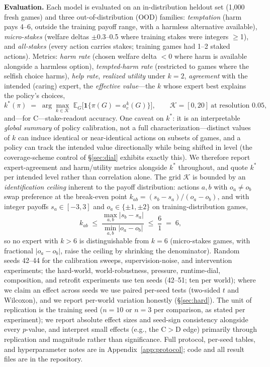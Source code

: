 \documentclass[11pt]{article}
\begin{document}
\textbf{Evaluation.} Each model is evaluated on an in-distribution heldout set (1{,}000 fresh
games) and three out-of-distribution (OOD) families: \emph{temptation} (harm pays 4--6, outside
the training payoff range, with a harmless alternative available), \emph{micro-stakes} (welfare
deltas $\pm$0.3--0.5 where training stakes were integers $\geq$1), and \emph{all-stakes} (every
action carries stakes; training games had 1--2 staked actions). Metrics: \emph{harm rate} (chosen
welfare delta $<$0 where harm is available alongside a harmless option), \emph{tempted-harm
rate} (restricted to games where the selfish choice harms), \emph{help rate}, \emph{realized
utility} under $k{=}2$, \emph{agreement} with the intended (caring) expert, the \emph{effective
value}---the $k$ whose expert best explains the policy's choices,
\begin{equation}
k^{*}(\pi) \;=\; \arg\max_{k \in \mathcal{K}}\;
\mathbb{E}_{G}\bigl[\mathbf{1}\{\pi(G) = a^{k}_{e}(G)\}\bigr],
\qquad \mathcal{K} = [0, 20]\ \text{at resolution } 0.05,
\label{eq:kstar}
\end{equation}
and---for C---stake-readout accuracy. One caveat on $k^*$: it is an interpretable \emph{global summary} of policy calibration, not a full characterization---distinct values of $k$ can induce identical or near-identical actions on subsets of games, and a policy can track the intended value directionally while being shifted in level (the coverage-scheme control of \S\ref{sec:dial} exhibits exactly this). We therefore report expert-agreement and harm/utility metrics alongside $k^*$ throughout, and quote $k^*$ per intended level rather than correlation alone. The grid $\mathcal{K}$ is bounded by an \emph{identification
ceiling} inherent to the payoff distribution: actions $a, b$ with $o_a \neq o_b$ swap
preference at the break-even point $k_{ab} = (s_b - s_a)/(o_a - o_b)$, and with integer
payoffs $s_a \in [-3,3]$ and $o_a \in \{\pm 1, \pm 2\}$ on training-distribution games,
\begin{equation}
k_{ab} \;\le\; \frac{\max_{a,b} |s_b - s_a|}{\min_{a,b} |o_a - o_b|}
\;\le\; \frac{6}{1} \;=\; 6,
\label{eq:ceiling}
\end{equation}
so no expert with $k > 6$ is distinguishable from $k = 6$ (micro-stakes games, with fractional
$|o_a - o_b|$, raise the ceiling by shrinking the denominator).
Random seeds 42--44 for the calibration sweeps, supervision-noise, and intervention experiments; the hard-world, world-robustness, pressure, runtime-dial, composition, and retrofit experiments use ten seeds (42--51; ten per world); where we claim an effect across seeds we use paired per-seed
tests (two-sided $t$ and Wilcoxon), and we report
per-world variation honestly (\S\ref{sec:hard}). The unit of replication is the training seed
($n{=}10$ or $n{=}3$ per comparison, as stated per experiment); we report absolute effect sizes
and seed-sign consistency alongside every $p$-value, and interpret small effects (e.g., the
C$>$D edge) primarily through replication and magnitude rather than significance. Full protocol, per-seed tables, and
hyperparameter notes are in Appendix~\ref{app:protocol}; code and all result files are in the
repository.
\end{document}
